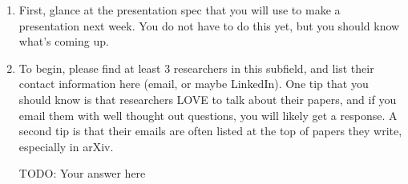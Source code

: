 \documentclass[letterpaper,11pt]{article}
\begin{document}
\begin{enumerate}
    \item First, glance at the presentation spec that you will use to make a presentation next week. You do not have to do this yet, but you should know what's coming up.
    \item 
    To begin, please find at least 3 researchers in this subfield, and list their contact information here (email, or maybe LinkedIn). One tip that you should know is that researchers LOVE to talk about their papers, and if you email them with well thought out questions, you will likely get a response. A second tip is that their emails are often listed at the top of papers they write, especially in arXiv.
    \begin{tcolorbox}
TODO: Your answer here
\newline
\newline
\newline
\newline
\newline
\newline
\newline
\newline
\newline
\newline
\newline
\end{tcolorbox}


\end{enumerate}
\end{document}
